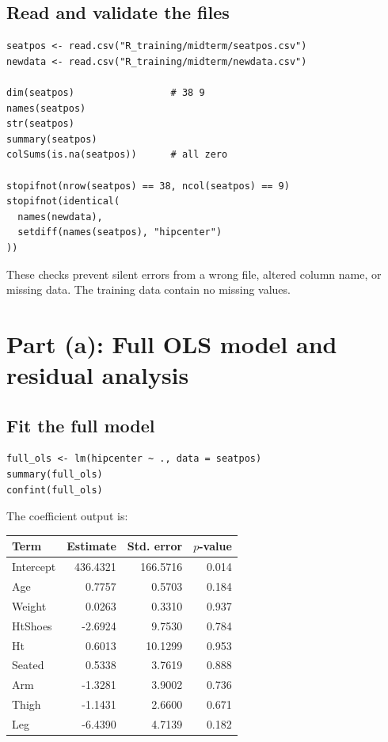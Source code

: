 ﻿\documentclass[11pt]{article}
\begin{document}
\subsection{Read and validate the files}

\begin{lstlisting}
seatpos <- read.csv("R_training/midterm/seatpos.csv")
newdata <- read.csv("R_training/midterm/newdata.csv")

dim(seatpos)                 # 38 9
names(seatpos)
str(seatpos)
summary(seatpos)
colSums(is.na(seatpos))      # all zero

stopifnot(nrow(seatpos) == 38, ncol(seatpos) == 9)
stopifnot(identical(
  names(newdata),
  setdiff(names(seatpos), "hipcenter")
))
\end{lstlisting}

These checks prevent silent errors from a wrong file, altered column name, or
missing data. The training data contain no missing values.

\section{Part (a): Full OLS model and residual analysis}

\subsection{Fit the full model}

\begin{lstlisting}
full_ols <- lm(hipcenter ~ ., data = seatpos)
summary(full_ols)
confint(full_ols)
\end{lstlisting}

The coefficient output is:

\begin{center}
\begin{tabular}{lrrr}
\toprule
\rowcolor{navy!10}\textbf{Term}&\textbf{Estimate}&\textbf{Std. error}&\textbf{$p$-value}\\
\midrule
Intercept&436.4321&166.5716&0.014\\
Age&0.7757&0.5703&0.184\\
Weight&0.0263&0.3310&0.937\\
HtShoes&-2.6924&9.7530&0.784\\
Ht&0.6013&10.1299&0.953\\
Seated&0.5338&3.7619&0.888\\
Arm&-1.3281&3.9002&0.736\\
Thigh&-1.1431&2.6600&0.671\\
Leg&-6.4390&4.7139&0.182\\
\bottomrule
\end{tabular}
\end{center}
\end{document}
